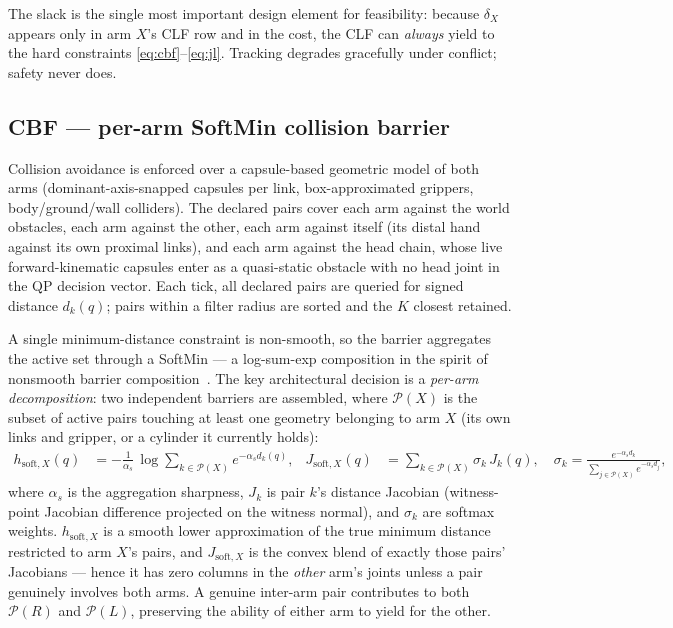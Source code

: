 \documentclass[12pt,a4paper,twoside,openright]{report}
\begin{document}
The slack is the single most important design element for feasibility: because $\delta_X$ appears only in arm $X$'s CLF row and in the cost, the CLF can \emph{always} yield to the hard constraints \eqref{eq:cbf}--\eqref{eq:jl}. Tracking degrades gracefully under conflict; safety never does.

\subsection{CBF --- per-arm SoftMin collision barrier}
\label{sec:cbf}

Collision avoidance is enforced over a capsule-based geometric model of both arms (dominant-axis-snapped capsules per link, box-approximated grippers, body/ground/wall colliders). The declared pairs cover each arm against the world obstacles, each arm against the other, each arm against itself (its distal hand against its own proximal links), and each arm against the head chain, whose live forward-kinematic capsules enter as a quasi-static obstacle with no head joint in the QP decision vector. Each tick, all declared pairs are queried for signed distance $d_k(q)$; pairs within a filter radius are sorted and the $K$ closest retained.

A single minimum-distance constraint is non-smooth, so the barrier aggregates the active set through a SoftMin --- a log-sum-exp composition in the spirit of nonsmooth barrier composition~\cite{glotfelter2017}. The key architectural decision is a \emph{per-arm decomposition}: two independent barriers are assembled, where $\mathcal{P}(X)$ is the subset of active pairs touching at least one geometry belonging to arm $X$ (its own links and gripper, or a cylinder it currently holds):
\begin{align}
h_{\text{soft},X}(q) &= -\frac{1}{\alpha_s}\,\log\!\!\sum_{k \in \mathcal{P}(X)} e^{-\alpha_s d_k(q)},
&
J_{\text{soft},X}(q) &= \sum_{k \in \mathcal{P}(X)} \sigma_k\, J_k(q),
\quad
\sigma_k = \frac{e^{-\alpha_s d_k}}{\sum_{j \in \mathcal{P}(X)} e^{-\alpha_s d_j}},
\label{eq:softmin}
\end{align}
where $\alpha_s$ is the aggregation sharpness, $J_k$ is pair $k$'s distance Jacobian (witness-point Jacobian difference projected on the witness normal), and $\sigma_k$ are softmax weights. $h_{\text{soft},X}$ is a smooth lower approximation of the true minimum distance restricted to arm $X$'s pairs, and $J_{\text{soft},X}$ is the convex blend of exactly those pairs' Jacobians --- hence it has zero columns in the \emph{other} arm's joints unless a pair genuinely involves both arms. A genuine inter-arm pair contributes to both $\mathcal{P}(R)$ and $\mathcal{P}(L)$, preserving the ability of either arm to yield for the other.
\end{document}
